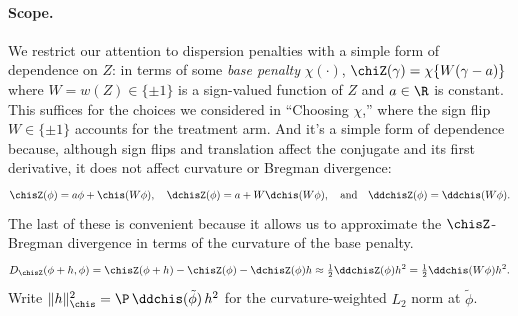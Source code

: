 \documentclass{article}
\begin{document}
\paragraph{Scope.}
\label{sec:scope}
We restrict our attention to dispersion penalties with a simple form of dependence on $Z$:
in terms of some \emph{base penalty} $\chi(\cdot)$, $\chiZ(\gamma) = \chi\{W(\gamma-a)\}$ where $W = w(Z) \in \{ \pm 1\}$ is a sign-valued function of $Z$ and $a \in\R$ is constant. This suffices for the choices we considered in ``Choosing $\chi$,'' where the sign flip $W \in \{\pm 1\}$ accounts for the treatment arm. And it's a simple form of dependence because, although sign flips and translation affect the conjugate and its first derivative, it does not affect curvature or Bregman divergence:
\[
\chisZ(\phi) = a\phi + \chis(W\phi), \quad \dchisZ(\phi) = a + W\dchis(W\phi), \quad \text{and} \quad \ddchisZ(\phi) = \ddchis(W\phi).
\]
The last of these is convenient because it allows us to approximate the $\chisZ$-Bregman divergence in terms of the curvature of the base penalty.
\[
D_{\chisZ}(\phi+h,\phi) = \chisZ(\phi+h) - \chisZ(\phi) - \dchisZ(\phi)h \approx \tfrac{1}{2}\ddchisZ(\phi)h^2 = \tfrac{1}{2}\ddchis(W\phi)h^2.
\]
Write $\|h\|_{\chis}^2 = \P\, \ddchis(\tilde\phi)\, h^2$ for the curvature-weighted $L_2$ norm at $\tilde\phi$.
\end{document}
